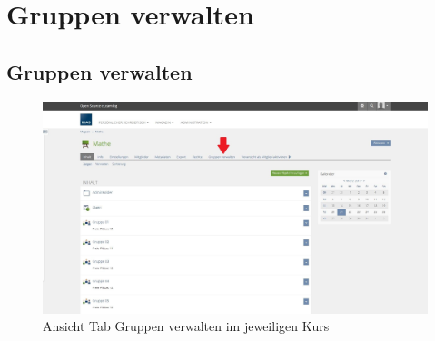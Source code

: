 \chapter{Gruppen verwalten}\label{gruppenVerwalten}
\minitoc
\clearpage


\section{Gruppen verwalten}
\begin{figure}[ht]
	\centering
	\includegraphics[width=1\textwidth]{img/gruppenverwalten.jpg}
	\caption{Ansicht Tab Gruppen verwalten im jeweiligen Kurs}
\end{figure}
\clearpage


